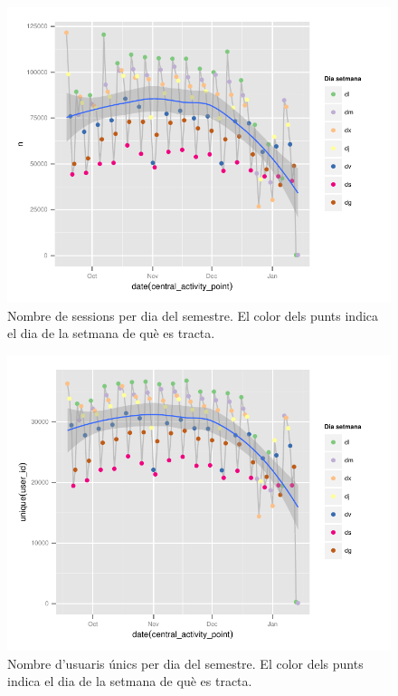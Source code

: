 \documentclass[
	a4paper,
	twoside,
	justified
]{tufte-book}
\begin{document}
\begin{figure}
\begin{center}
\includegraphics{n_sessions_pday_scatter}
\caption{
	\label{graph:n_sessions_pday_scatter}
	Nombre de sessions per dia del semestre. El color dels punts indica el dia de la setmana de què es tracta. 
}
\end{center}
\end{figure}

\begin{figure}
\begin{center}
\includegraphics{n_users_pday_scatter}
\caption{	
	\label{graph:n_users_pday_scatter}
	Nombre d'usuaris únics per dia del semestre. El color dels punts indica el dia de la setmana de què es tracta. 
}
\end{center}
\end{figure}
\end{document}
